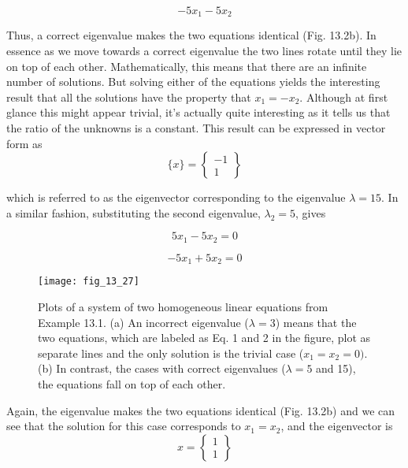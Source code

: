 \documentclass[../main.tex]{subfiles}
\begin{document}
\begin{equation}
-5x_{1}-5x_{2}
\end{equation}

Thus, a correct eigenvalue makes the two equations identical (Fig. 13.2b). In essence as we
move towards a correct eigenvalue the two lines rotate until they lie on top of each other.
Mathematically, this means that there are an infinite number of solutions. But solving
either of the equations yields the interesting result that all the solutions have the property
that $x_{1} = -x_{2}$. Although at first glance this might appear trivial, it’s actually quite interesting
as it tells us that the ratio of the unknowns is a constant. This result can be expressed in vector form as
\begin{equation}
\{x\}=\begin{Bmatrix}
-1\\
1
\end{Bmatrix}
\end{equation}

which is referred to as the eigenvector corresponding to the eigenvalue $\lambda = 15$.
In a similar fashion, substituting the second eigenvalue, $\lambda_{2} = 5$, gives

\begin{equation}
5x_{1}-5x_{2}=0
\end{equation}

\begin{equation}
-5x_{1}+5x_{2}=0
\end{equation}

\begin{figure}[H]
		\centering
		\texttt{[image: fig\_13\_27]}
	   \caption{\textsf{Plots of a system of two homogeneous linear equations from Example 13.1. (a) An incorrect
eigenvalue ($\lambda = 3$) means that the two equations, which are labeled as Eq. 1 and 2 in the
figure, plot as separate lines and the only solution is the trivial case ($x_{1} = x_{2} = 0)$. (b) In contrast,
the cases with correct eigenvalues ($\lambda = 5$ and 15), the equations fall on top of each other.}}
	   \label{fig:fig_13_27}
\end{figure}

Again, the eigenvalue makes the two equations identical (Fig. 13.2b) and we can see that
the solution for this case corresponds to $x_{1} = x_{2}$, and the eigenvector is
\begin{equation}
{x}=\begin{Bmatrix}
1\\
1
\end{Bmatrix}
\end{equation}
\end{document}
